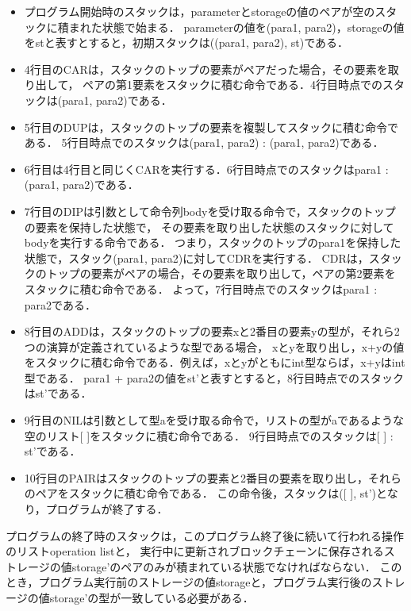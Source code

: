 \documentclass{kuisthesis}
\begin{document}
\begin{itemize}
  \item プログラム開始時のスタックは，parameterとstorageの値のペアが空のスタックに積まれた状態で始まる．
  parameterの値を(para1, para2)，storageの値をstと表すとすると，初期スタックは((para1, para2), st)である．
  \item 4行目のCARは，スタックのトップの要素がペアだった場合，その要素を取り出して，
  ペアの第1要素をスタックに積む命令である．4行目時点でのスタックは(para1, para2)である．
  \item 5行目のDUPは，スタックのトップの要素を複製してスタックに積む命令である．
  5行目時点でのスタックは(para1, para2) : (para1, para2)である．
  \item 6行目は4行目と同じくCARを実行する．6行目時点でのスタックはpara1 : (para1, para2)である．
  \item 7行目のDIPは引数として命令列bodyを受け取る命令で，スタックのトップの要素を保持した状態で，
  その要素を取り出した状態のスタックに対してbodyを実行する命令である．
  つまり，スタックのトップのpara1を保持した状態で，スタック(para1, para2)に対してCDRを実行する．
  CDRは，スタックのトップの要素がペアの場合，その要素を取り出して，ペアの第2要素をスタックに積む命令である．
  よって，7行目時点でのスタックはpara1 : para2である．
  \item 8行目のADDは，スタックのトップの要素xと2番目の要素yの型が，それら2つの演算が定義されているような型である場合，
  xとyを取り出し，x+yの値をスタックに積む命令である．例えば，xとyがともにint型ならば，x+yはint型である．
  para1 + para2の値をst'と表すとすると，8行目時点でのスタックはst'である．
  \item 9行目のNILは引数として型aを受け取る命令で，リストの型がaであるような空のリスト[ ]をスタックに積む命令である．
  9行目時点でのスタックは[ ] : st'である．
  \item 10行目のPAIRはスタックのトップの要素と2番目の要素を取り出し，それらのペアをスタックに積む命令である．
  この命令後，スタックは([ ], st')となり，プログラムが終了する．
\end{itemize}

プログラムの終了時のスタックは，このプログラム終了後に続いて行われる操作のリストoperation listと，
実行中に更新されブロックチェーンに保存されるストレージの値storage'のペアのみが積まれている状態でなければならない．
このとき，プログラム実行前のストレージの値storageと，プログラム実行後のストレージの値storage'の型が一致している必要がある．
\end{document}
